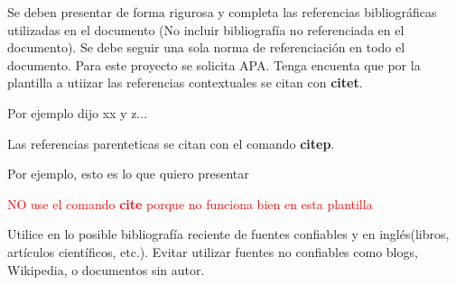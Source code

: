 Se deben presentar de forma rigurosa y completa las referencias bibliográficas utilizadas en el documento (No incluir bibliografía no referenciada en el documento). Se debe seguir una sola norma de referenciación en todo el documento. Para este proyecto se solicita APA. Tenga encuenta que por la plantilla a utiizar las referencias contextuales se citan con \textbf{citet}. 

Por ejemplo \parencite{DaSilvaCosta2022} dijo xx y z... 

Las referencias parenteticas se citan con el comando \textbf{citep}. 

Por ejemplo, esto es lo que quiero presentar \parencite{Glorot2011}

\textcolor{red}{NO use el comando \textbf{cite} porque no funciona bien en esta plantilla}

Utilice en lo posible bibliografía reciente de fuentes confiables y en inglés(libros, artículos científicos, etc.). Evitar utilizar fuentes no confiables como blogs, Wikipedia, o documentos sin autor.